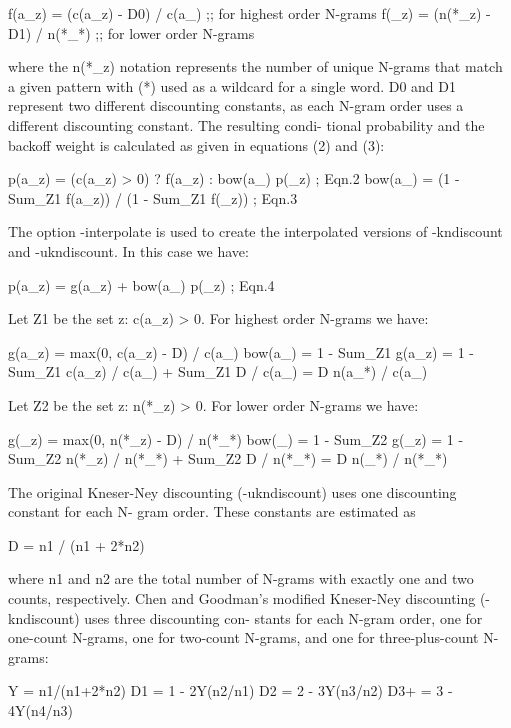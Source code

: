 \documentclass[ignorenonframetext]{beamer}
\begin{document}
            f(a_z) = (c(a_z) - D0) / c(a_)     ;; for highest order N-grams
            f(_z)  = (n(*_z) - D1) / n(*_*)    ;; for lower order N-grams

       where the n(*_z) notation represents the number of unique N-grams that match a  given  pattern
       with  (*) used as a wildcard for a single word.  D0 and D1 represent two different discounting
       constants, as each N-gram order uses a different discounting constant.  The  resulting  condi-
       tional probability and the backoff weight is calculated as given in equations (2) and (3):

            p(a_z)  = (c(a_z) > 0) ? f(a_z) : bow(a_) p(_z)     ; Eqn.2
            bow(a_) = (1 - Sum_Z1 f(a_z)) / (1 - Sum_Z1 f(_z))  ; Eqn.3

       The  option  -interpolate  is  used  to  create  the  interpolated versions of -kndiscount and
       -ukndiscount.  In this case we have:

            p(a_z) = g(a_z) + bow(a_) p(_z)  ; Eqn.4

       Let Z1 be the set {z: c(a_z) > 0}.  For highest order N-grams we have:

            g(a_z)  = max(0, c(a_z) - D) / c(a_)
            bow(a_) = 1 - Sum_Z1 g(a_z)
                    = 1 - Sum_Z1 c(a_z) / c(a_) + Sum_Z1 D / c(a_)
                    = D n(a_*) / c(a_)

       Let Z2 be the set {z: n(*_z) > 0}.  For lower order N-grams we have:

            g(_z)  = max(0, n(*_z) - D) / n(*_*)
            bow(_) = 1 - Sum_Z2 g(_z)
                   = 1 - Sum_Z2 n(*_z) / n(*_*) + Sum_Z2 D / n(*_*)
                   = D n(_*) / n(*_*)

       The original Kneser-Ney discounting (-ukndiscount) uses one discounting constant for  each  N-
       gram order.  These constants are estimated as

            D = n1 / (n1 + 2*n2)

       where n1 and n2 are the total number of N-grams with exactly one and two counts, respectively.
       Chen and Goodman's modified Kneser-Ney discounting (-kndiscount) uses three  discounting  con-
       stants  for  each  N-gram order, one for one-count N-grams, one for two-count N-grams, and one
       for three-plus-count N-grams:

            Y   = n1/(n1+2*n2)
            D1  = 1 - 2Y(n2/n1)
            D2  = 2 - 3Y(n3/n2)
            D3+ = 3 - 4Y(n4/n3)
\end{document}
